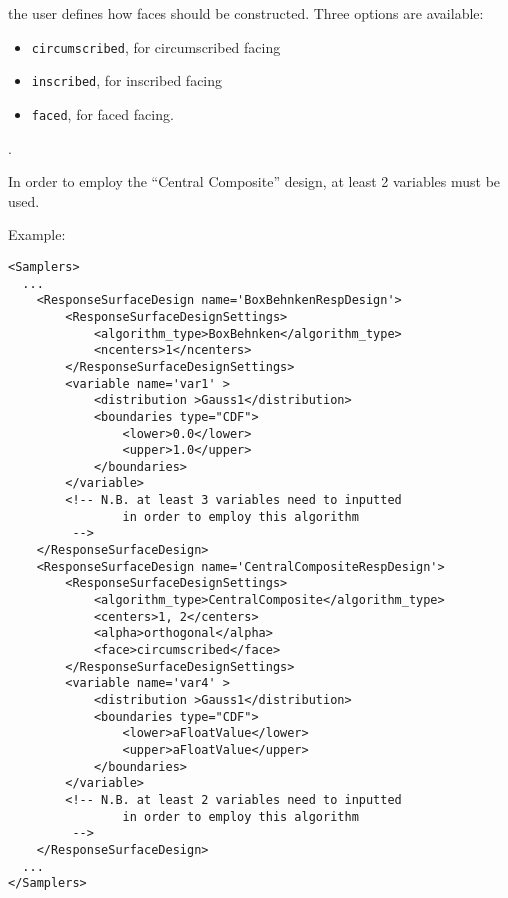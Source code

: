 \begin{itemize}
\begin{itemize}
\begin{itemize}
            the user defines how faces should be constructed.
            Three options are available:
            \begin{itemize}
              \item \texttt{circumscribed}, for circumscribed facing
              \item \texttt{inscribed}, for inscribed facing
              \item \texttt{faced}, for faced facing.
            \end{itemize}
            .
         \end{itemize}
      \end{itemize}
      \nb In order to employ the ``Central Composite'' design, at least 2
      variables must be used.
    \end{itemize}



Example:
\begin{lstlisting}[style=XML,morekeywords={}]
<Samplers>
  ...
    <ResponseSurfaceDesign name='BoxBehnkenRespDesign'>
        <ResponseSurfaceDesignSettings>
            <algorithm_type>BoxBehnken</algorithm_type>
            <ncenters>1</ncenters>
        </ResponseSurfaceDesignSettings>
        <variable name='var1' >
            <distribution >Gauss1</distribution>
            <boundaries type="CDF">
                <lower>0.0</lower>
                <upper>1.0</upper>
            </boundaries>
        </variable>
        <!-- N.B. at least 3 variables need to inputted 
                in order to employ this algorithm
         -->
    </ResponseSurfaceDesign>
    <ResponseSurfaceDesign name='CentralCompositeRespDesign'>
        <ResponseSurfaceDesignSettings>
            <algorithm_type>CentralComposite</algorithm_type>
            <centers>1, 2</centers>
            <alpha>orthogonal</alpha>
            <face>circumscribed</face>
        </ResponseSurfaceDesignSettings>
        <variable name='var4' >
            <distribution >Gauss1</distribution>
            <boundaries type="CDF">
                <lower>aFloatValue</lower>
                <upper>aFloatValue</upper>
            </boundaries>
        </variable>
        <!-- N.B. at least 2 variables need to inputted 
                in order to employ this algorithm
         -->        
    </ResponseSurfaceDesign>
  ...
</Samplers>
\end{lstlisting}

